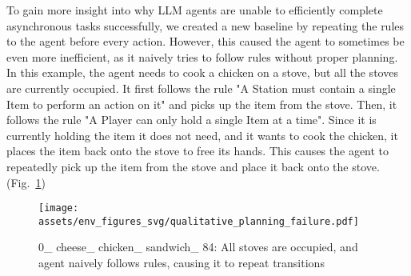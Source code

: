 To gain more insight into why LLM agents are unable to efficiently complete asynchronous tasks successfully, we created a new baseline by repeating the rules to the agent before every action. However, this caused the agent to sometimes be even more inefficient, as it naively tries to follow rules without proper planning. \\

In this example, the agent needs to cook a chicken on a stove, but all the stoves are currently occupied. It first follows the rule "A Station must contain a single Item to perform an action on it" and picks up the item from the stove. Then, it follows the rule "A Player can only hold a single Item at a time". Since it is currently holding the item it does not need, and it wants to cook the chicken, it places the item back onto the stove to free its hands. This causes the agent to repeatedly pick up the item from the stove and place it back onto the stove. (Fig.~\ref{fig:qualitative_planning_fail})

\begin{figure}[t!]
    \centering
    \texttt{[image: assets/env\_figures\_svg/qualitative\_planning\_failure.pdf]}
    \caption{0\_ cheese\_ chicken\_ sandwich\_ 84: All stoves are occupied, and agent naively follows rules, causing it to repeat transitions}
    \label{fig:qualitative_planning_fail}
\end{figure}



